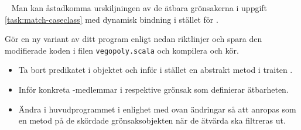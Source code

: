 










\AdvancedTasks %




\QUESTBEGIN

\Task  \what~ Man kan åstadkomma urskiljningen av de ätbara grönsakerna i uppgift \ref{task:match-caseclass} med dynamisk bindning i stället för .

\Subtask Gör en ny variant av ditt program enligt nedan riktlinjer och spara den modifierade koden i filen \texttt{vegopoly.scala} och kompilera och kör.
\begin{itemize}[noitemsep]
\item Ta bort predikatet  i objektet  och inför i stället en abstrakt metod  i traiten .
\item Inför konkreta -medlemmar i respektive grönsak som definierar ätbarheten.
\item Ändra i huvudprogrammet i enlighet med ovan ändringar så att  anropas som en metod på de skördade grönsaksobjekten när de ätvärda ska filtreras ut.
\end{itemize}

